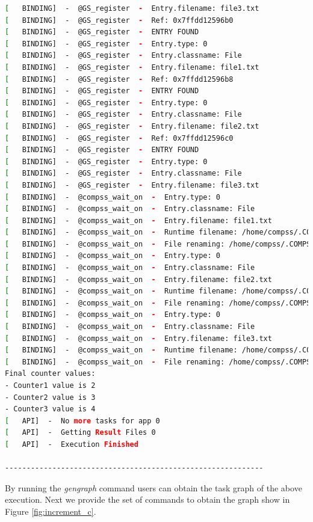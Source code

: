 \begin{lstlisting}[language=bash]
[   BINDING]  -  @GS_register  -  Entry.filename: file3.txt
[   BINDING]  -  @GS_register  -  Ref: 0x7ffdd12596b0
[   BINDING]  -  @GS_register  -  ENTRY FOUND
[   BINDING]  -  @GS_register  -  Entry.type: 0
[   BINDING]  -  @GS_register  -  Entry.classname: File
[   BINDING]  -  @GS_register  -  Entry.filename: file1.txt
[   BINDING]  -  @GS_register  -  Ref: 0x7ffdd12596b8
[   BINDING]  -  @GS_register  -  ENTRY FOUND
[   BINDING]  -  @GS_register  -  Entry.type: 0
[   BINDING]  -  @GS_register  -  Entry.classname: File
[   BINDING]  -  @GS_register  -  Entry.filename: file2.txt
[   BINDING]  -  @GS_register  -  Ref: 0x7ffdd12596c0
[   BINDING]  -  @GS_register  -  ENTRY FOUND
[   BINDING]  -  @GS_register  -  Entry.type: 0
[   BINDING]  -  @GS_register  -  Entry.classname: File
[   BINDING]  -  @GS_register  -  Entry.filename: file3.txt
[   BINDING]  -  @compss_wait_on  -  Entry.type: 0
[   BINDING]  -  @compss_wait_on  -  Entry.classname: File
[   BINDING]  -  @compss_wait_on  -  Entry.filename: file1.txt
[   BINDING]  -  @compss_wait_on  -  Runtime filename: /home/compss/.COMPSs/increment_01/tmpFiles/d1v11_1446817729367.IT
[   BINDING]  -  @compss_wait_on  -  File renaming: /home/compss/.COMPSs/increment_01/tmpFiles/d1v11_1446817729367.IT to file1.txt
[   BINDING]  -  @compss_wait_on  -  Entry.type: 0
[   BINDING]  -  @compss_wait_on  -  Entry.classname: File
[   BINDING]  -  @compss_wait_on  -  Entry.filename: file2.txt
[   BINDING]  -  @compss_wait_on  -  Runtime filename: /home/compss/.COMPSs/increment_01/tmpFiles/d2v11_1446817729367.IT
[   BINDING]  -  @compss_wait_on  -  File renaming: /home/compss/.COMPSs/increment_01/tmpFiles/d2v11_1446817729367.IT to file2.txt
[   BINDING]  -  @compss_wait_on  -  Entry.type: 0
[   BINDING]  -  @compss_wait_on  -  Entry.classname: File
[   BINDING]  -  @compss_wait_on  -  Entry.filename: file3.txt
[   BINDING]  -  @compss_wait_on  -  Runtime filename: /home/compss/.COMPSs/increment_01/tmpFiles/d3v11_1446817729367.IT
[   BINDING]  -  @compss_wait_on  -  File renaming: /home/compss/.COMPSs/increment_01/tmpFiles/d3v11_1446817729367.IT to file3.txt
Final counter values: 
- Counter1 value is 2
- Counter2 value is 3
- Counter3 value is 4
[   API]  -  No more tasks for app 0
[   API]  -  Getting Result Files 0
[   API]  -  Execution Finished

------------------------------------------------------------
\end{lstlisting}

By running the \textit{gengraph} command users can obtain the task graph of the above execution. Next we provide the set of commands
to obtain the graph show in Figure \ref{fig:increment_c}.

